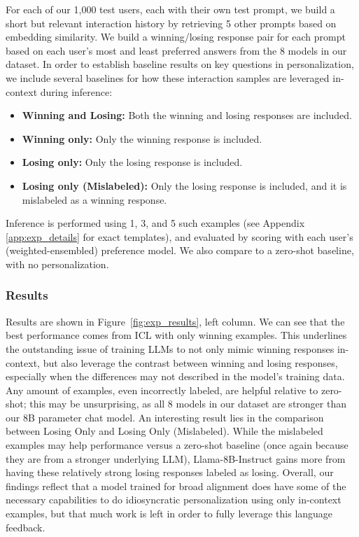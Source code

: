 For each of our 1,000 test users, each with their own test prompt, we build a short but relevant interaction history by retrieving 5 other prompts based on embedding similarity. We build a winning/losing response pair for each prompt based on each user's most and least preferred answers from the 8 models in our dataset.  In order to establish baseline results on key questions in personalization, we include several baselines for how these interaction samples are leveraged in-context during inference: 
\begin{itemize}
    \item \textbf{Winning and Losing:} Both the winning and losing responses are included.
    \item \textbf{Winning only:} Only the winning response is included.
    \item \textbf{Losing only:} Only the losing response is included.
    \item \textbf{Losing only (Mislabeled):} Only the losing response is included, and it is mislabeled as a winning response.
\end{itemize}
Inference is performed using 1, 3, and 5 such examples (see Appendix \ref{app:exp_details} for exact templates), and evaluated by scoring with each user's (weighted-ensembled) preference model.  We also compare to a zero-shot baseline, with no personalization.

\subsubsection{Results}

Results are shown in Figure~\ref{fig:exp_results}, left column.  
We can see that the best performance comes from ICL with only winning examples. 
This underlines the outstanding issue of training LLMs to not only mimic winning responses in-context, but also leverage the contrast between winning and losing responses, especially when the differences may not described in the model's training data.
Any amount of examples, even incorrectly labeled, are helpful relative to zero-shot; this may be unsurprising, as all 8 models in our dataset are stronger than our 8B parameter chat model.
An interesting result lies in the comparison between Losing Only and Losing Only (Mislabeled).  
While the mislabeled examples may help performance versus a zero-shot baseline (once again because they are from a stronger underlying LLM), Llama-8B-Instruct gains more from having these relatively strong losing responses labeled as losing.
Overall, our findings reflect that a model trained for broad alignment does have some of the necessary capabilities to do idiosyncratic personalization using only in-context examples, but that much work is left in order to fully leverage this language feedback.

